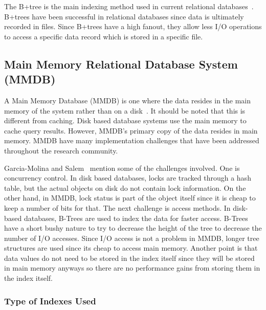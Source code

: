 \documentclass[12pt,a4paper]{article}
\begin{document}
The B+tree is the main indexing method used in current relational databases~\cite{lightstone2007physical}. B+trees have been successful in relational databases
since data is ultimately recorded in files. Since B+trees have a high fanout, they allow less I/O operations to access a specific data record which is stored in
a specific file.



\subsection{Main Memory Relational Database System (MMDB)}
\label{SEC-MMDB}

A Main Memory Database (MMDB) is one where the data resides in the main memory of the system rather than on a disk~\cite{garcia1992main}. It should be noted
that this is different from caching. Disk based database systems use the main memory to cache query results. However, MMDB's primary copy of the data resides in
main memory. MMDB have many implementation challenges that have been addressed throughout the research community.


Garcia-Molina and Salem~\cite{garcia1992main} mention some of the challenges involved. One is concurrency control. In disk based databases, locks are tracked
through a hash table, but the actual objects on disk do not contain lock information. On the other hand, in MMDB, lock status is part of the object itself since
it is cheap to keep a number of bits for that. The next challenge is access methods. In disk-based databases, B-Trees are used to index the data for faster
access. B-Trees have a short bushy nature to try to decrease the height of the tree to decrease the number of I/O accesses. Since I/O access is not a problem in
MMDB, longer tree structures are used since its cheap to access main memory. Another point is that data values do not need to be stored in the index itself
since they will be stored in main memory anyways so there are no performance gains from storing them in the index itself.


\subsubsection{Type of Indexes Used}
\end{document}
